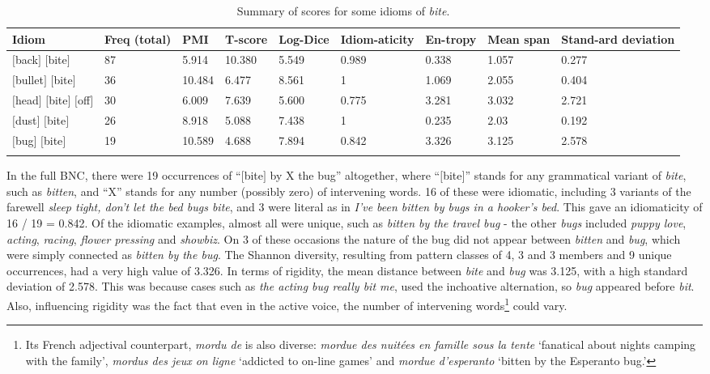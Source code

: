 \documentclass[output=paper]{langsci/langscibook}
\begin{document}
\begin{table}[H]
\small
\begin{tabular}{p{1.9cm} p{0.7cm}p{0.7cm}p{0.8cm}p{0.85cm}p{0.85cm}p{0.85cm}p{0.85cm}p{0.9cm}}
\lsptoprule
Idiom &
Freq (total) &
PMI &
T-score &
Log-Dice &
Idiom-aticity &
En-tropy &
Mean span &
Stand-ard deviation\\
\midrule
$[$back$]$ $[$bite$]$ &
87 &
5.914 &
10.380 &
5.549 &
0.989 &
0.338 &
1.057 &
0.277\\
$[$bullet$]$ $[$bite$]$ &
36 &
10.484 &
6.477 &
8.561 &
1 &
1.069 &
2.055 &
0.404\\
$[$head$]$ $[$bite$]$ $[$off$]$ &
30 &
6.009 &
7.639 &
5.600 &
0.775 &
3.281 &
3.032 &
2.721\\
$[$dust$]$ $[$bite$]$ &
26 &
8.918 &
5.088 &
7.438 &
1 &
0.235 &
2.03 &
0.192\\
$[$bug$]$ $[$bite$]$ &
19 &
10.589 &
4.688 &
7.894 &
0.842 &
3.326 &
3.125 &
2.578\\
\lspbottomrule
\end{tabular}
\caption{Summary of scores for some idioms of \textit{bite}.}
\label{score idiom bite}
\end{table}




In the full BNC, there were 19 occurrences of “$[$bite$]$ by X the bug”
altogether, where ``$[$bite$]$'' stands for any grammatical variant of
\textit{bite}, such as \textit{bitten}, and ``X'' stands for any number (possibly zero)
of intervening words. 16 of these were idiomatic, including 3 variants
of the farewell \textit{sleep tight, don’t let the bed bugs bite}, and 3 were
literal as in \textit{I’ve been bitten by bugs in a hooker’s bed}. This gave
an idiomaticity of 16 / 19 = 0.842. Of the idiomatic examples, almost
all were unique, such as \textit{bitten by the travel bug} - the other \textit{bugs}
included \textit{puppy love}, \textit{acting}, \textit{racing}, \textit{flower pressing} and
\textit{showbiz}. On 3 of these occasions the nature of the bug did not appear
between \textit{bitten} and \textit{bug}, which were simply connected as \textit{bitten by
the bug}. The Shannon diversity, resulting from pattern classes of 4, 3
and 3 members and 9 unique occurrences, had a very high value of 3.326.
In terms of rigidity, the mean distance between \textit{bite} and \textit{bug} was
3.125, with a high standard deviation of 2.578. This was because  cases such as \textit{the acting bug really bit me}, used the
inchoative alternation, so \textit{bug} appeared before \textit{bit}. Also, influencing rigidity was the fact that even in the active voice, the
number of intervening  words\footnote{Its French adjectival
counterpart, \textit{mordu de} is also  diverse: 
\textit{mordue des nuitées en famille sous la tente} `fanatical about nights
camping with the family', \textit{mordus des jeux on ligne} `addicted to
on-line games' and \textit{mordue d’esperanto} `bitten by the Esperanto
bug.'} could 
vary.
\end{document}
